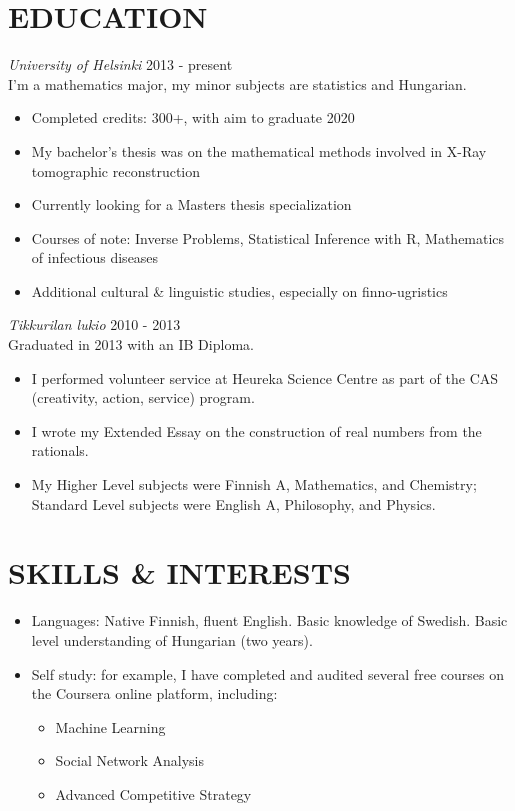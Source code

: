 \documentclass[margin, 10pt]{res} %
\begin{document}
\begin{resume}

\section{EDUCATION}

{\sl University of Helsinki} \hfill 2013 - present\\
I'm a mathematics major, my minor subjects are statistics and Hungarian.
\begin{itemize} \itemsep -2pt
\item Completed credits: 300+, with aim to graduate 2020
\item My bachelor's thesis was on the mathematical methods involved in X-Ray tomographic reconstruction
\item Currently looking for a Masters thesis specialization
\item Courses of note: Inverse Problems, Statistical Inference with R, Mathematics of infectious diseases
\item Additional cultural \& linguistic studies, especially on finno-ugristics
\end{itemize}

\addvspace{-7pt}
{\sl Tikkurilan lukio} \hfill 2010 - 2013\\
Graduated in 2013 with an IB Diploma.
\begin{itemize} \itemsep -2pt
\item I performed volunteer service at Heureka Science Centre as part of the CAS (creativity, action, service) program.
\item I wrote my Extended Essay on the construction of real numbers from the rationals.
\item My Higher Level subjects were Finnish A, Mathematics, and Chemistry; Standard Level subjects were English A, Philosophy, and Physics. 
\end{itemize}

\section{SKILLS \& INTERESTS}
\begin{itemize} \itemsep -2pt
\item Languages: Native Finnish, fluent English. Basic knowledge of Swedish. Basic level understanding of Hungarian (two years).
\item Self study: for example, I have completed and audited several free courses on the Coursera online platform, including:
  \begin{itemize} \itemsep -2pt
  \item Machine Learning
  \item Social Network Analysis
  \item Advanced Competitive Strategy
  \end{itemize}


\end{itemize}
\end{resume}
\end{document}
